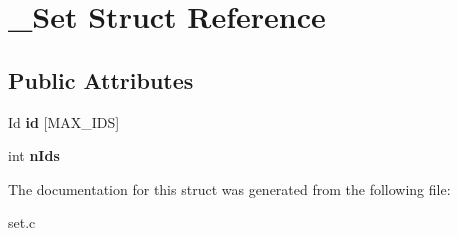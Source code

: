 \hypertarget{struct__Set}{}\section{\+\_\+\+Set Struct Reference}
\label{struct__Set}
\subsection*{Public Attributes}
\begin{DoxyCompactItemize}
\item 
\mbox{\label{struct__Set_a2f96cef7e83d5a8496d9ef1f0f03894a}} 
Id {\bfseries id} \mbox{[}M\+A\+X\+\_\+\+I\+DS\mbox{]}
\item 
\mbox{\label{struct__Set_a53be11e7eaaf93c2819c6c29dba064c9}} 
int {\bfseries n\+Ids}
\end{DoxyCompactItemize}


The documentation for this struct was generated from the following file\+:\begin{DoxyCompactItemize}
\item 
set.\+c\end{DoxyCompactItemize}
